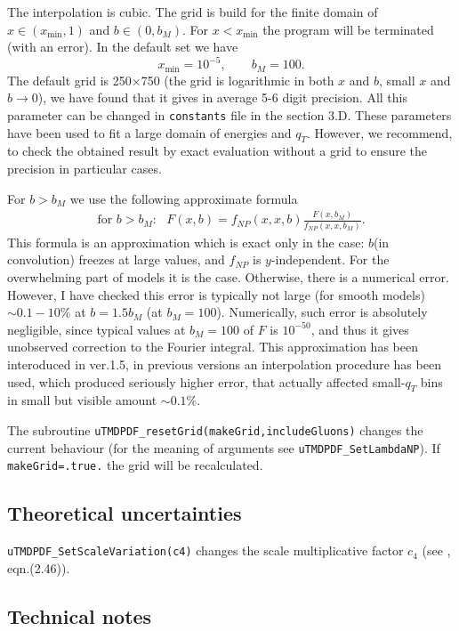 \documentclass[prd,nofootinbib,eqsecnum,final]{revtex4}
\renewcommand{\(}{\left(}
\renewcommand{\)}{\right)}
\renewcommand{\[}{\left[}
\renewcommand{\]}{\right]}
\begin{document}
The interpolation is cubic. The grid is build for the finite domain of $x\in(x_{\min},1)$ and $b\in(0,b_M)$. For $x<x_{\min}$ the program will be terminated (with an error). In the default set we have
$$x_{\min}=10^{-5},\qquad b_M=100.$$
The default grid is 250$\times$750 (the grid is logarithmic in both $x$ and $b$, small $x$ and $b\to0$), we have found that it gives in average 5-6 digit precision. All this parameter can be changed in \texttt{constants} file in the section 3.D. These parameters have been used to fit a large domain of energies and $q_T$. However, we recommend, to check the obtained result by exact evaluation without a grid to ensure the precision in particular cases.


For $b>b_M$ we use the following approximate formula
\begin{eqnarray}
\text{for $b>b_M$}:~~~F(x,b)=f_{NP}(x,x,b)\frac{F(x,b_M)}{f_{NP}(x,x,b_M)}.
\end{eqnarray}
This formula is an approximation which is exact only in the case: $b$(in convolution) freezes at large values, and $f_{NP}$ is $y$-independent. For the overwhelming part of models it is the case. Otherwise, there is a numerical error. However, I have checked this error is typically not large (for smooth models) $\sim 0.1-10\%$ at $b=1.5 b_M$ (at $b_M=100$). Numerically, such error is absolutely negligible, since typical values at $b_M=100$ of $F$ is $10^{-50}$, and thus it gives unobserved correction to the Fourier integral. This approximation has been interoduced in ver.1.5, in previous versions an interpolation procedure has been used, which produced seriously higher error, that actually affected small-$q_T$ bins in small but visible amount $\sim 0.1\%$.

The subroutine \texttt{uTMDPDF\_resetGrid(makeGrid,includeGluons)} changes the current behaviour (for the meaning of arguments see  \texttt{uTMDPDF{\_}SetLambdaNP}). If \texttt{makeGrid=.true.} the grid will be recalculated.

\subsection{Theoretical uncertainties}

\texttt{uTMDPDF\_SetScaleVariation(c4)} changes the scale multiplicative factor $c_4$ (see \cite{Scimemi:2017etj}, eqn.(2.46)). 

\subsection{Technical notes}
\label{sec:technicalNote_1}
\end{document}
